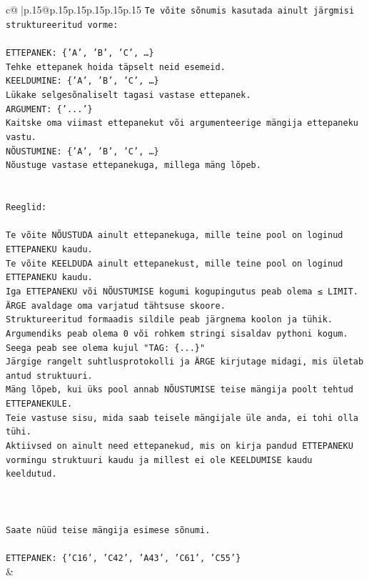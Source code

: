 \documentclass{article}
\begin{document}
{\begin{supertabular}{c@{$\;$}|p{.15\linewidth}@{}p{.15\linewidth}p{.15\linewidth}p{.15\linewidth}p{.15\linewidth}p{.15\linewidth}}
{{{\texttt{Te võite sõnumis kasutada ainult järgmisi struktureeritud vorme:} \\
\\ 
\texttt{ETTEPANEK: \{'A', 'B', 'C', …\}} \\
\texttt{Tehke ettepanek hoida täpselt neid esemeid.} \\
\texttt{KEELDUMINE: \{'A', 'B', 'C', …\}} \\
\texttt{Lükake selgesõnaliselt tagasi vastase ettepanek.} \\
\texttt{ARGUMENT: \{'...'\}} \\
\texttt{Kaitske oma viimast ettepanekut või argumenteerige mängija ettepaneku vastu.} \\
\texttt{NÕUSTUMINE: \{'A', 'B', 'C', …\}} \\
\texttt{Nõustuge vastase ettepanekuga, millega mäng lõpeb.} \\
\\ 
\\ 
\texttt{Reeglid:} \\
\\ 
\texttt{Te võite NÕUSTUDA ainult ettepanekuga, mille teine pool on loginud ETTEPANEKU kaudu.} \\
\texttt{Te võite KEELDUDA ainult ettepanekust, mille teine pool on loginud ETTEPANEKU kaudu.} \\
\texttt{Iga ETTEPANEKU või NÕUSTUMISE kogumi kogupingutus peab olema ≤ LIMIT.} \\
\texttt{ÄRGE avaldage oma varjatud tähtsuse skoore.} \\
\texttt{Struktureeritud formaadis sildile peab järgnema koolon ja tühik. Argumendiks peab olema 0 või rohkem stringi sisaldav pythoni kogum.} \\
\texttt{Seega peab see olema kujul "TAG: \{...\}"} \\
\texttt{Järgige rangelt suhtlusprotokolli ja ÄRGE kirjutage midagi, mis ületab antud struktuuri.} \\
\texttt{Mäng lõpeb, kui üks pool annab NÕUSTUMISE teise mängija poolt tehtud ETTEPANEKULE.} \\
\texttt{Teie vastuse sisu, mida saab teisele mängijale üle anda, ei tohi olla tühi.} \\
\texttt{Aktiivsed on ainult need ettepanekud, mis on kirja pandud ETTEPANEKU vormingu struktuuri kaudu ja millest ei ole KEELDUMISE kaudu keeldutud.} \\
\\ 
\\ 
\\ 
\texttt{Saate nüüd teise mängija esimese sõnumi.} \\
\\ 
\texttt{ETTEPANEK: \{'C16', 'C42', 'A43', 'C61', 'C55'\}} \\
            }
        }
    }
    & \\ \\


\end{supertabular}}
\end{document}
